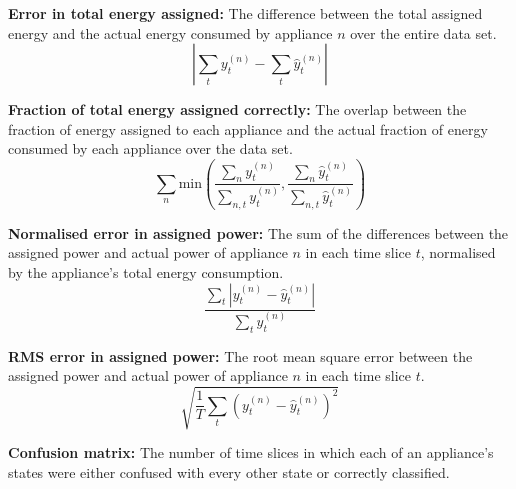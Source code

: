 \documentclass{sig-alternate}
\begin{document}
\textbf{Error in total energy assigned:} The difference between the total assigned energy and the actual energy consumed by appliance $n$ over the entire data set.
\begin{equation}
        \left | \sum_t y^{(n)}_t - \sum_t \hat{y}^{(n)}_t \right |
\end{equation}

\textbf{Fraction of total energy assigned correctly:} The overlap between the fraction of energy assigned to each appliance and the actual fraction of energy consumed by each appliance over the data set.
\begin{equation}
        \sum_n \mathrm{min} \left ( 
        \frac{\sum_n y^{(n)}_t}{\sum_{n,t} y^{(n)}_t}, 
        \frac{\sum_n \hat{y}^{(n)}_t}{\sum_{n,t} \hat{y}^{(n)}_t} 
        \right )
\end{equation}

\textbf{Normalised error in assigned power:} The sum of the differences between the assigned power and actual power of appliance $n$ in each time slice $t$, normalised by the appliance's total energy consumption.
\begin{equation}
        \frac
        { \sum_t {\left | y_t^{(n)} - \hat{y}_t^{(n)} \right |} }
        { \sum_t y_t^{(n)} }
\end{equation}

\textbf{RMS error in assigned power:} The root mean square error between the assigned power and actual power of appliance $n$ in each time slice $t$.
\begin{equation}
\sqrt{ \frac{1}{T} \sum_t{ \left ( y^{(n)}_t - \hat{y}^{(n)}_t \right )^2 } }
\end{equation}

\textbf{Confusion matrix:} The number of time slices in which each of an appliance's states were either confused with every other state or correctly classified.
\end{document}
